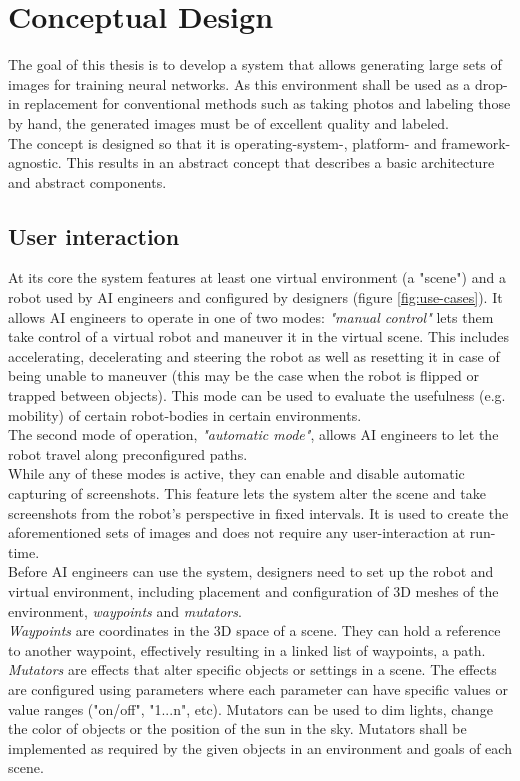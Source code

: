 \chapter{Conceptual Design}
\label{chap:conceptual-design}
The goal of this thesis is to develop a system that allows generating large sets of images for training neural networks. As this environment shall be used as a drop-in replacement for conventional methods such as taking photos and labeling those by hand, the generated images must be of excellent quality and labeled.\\
The concept is designed so that it is operating-system-, platform- and framework-agnostic. This results in an abstract concept that describes a basic architecture and abstract components. 

\section{User interaction}
At its core the system features at least one virtual environment (a "scene") and a robot used by AI engineers and configured by designers (figure \ref{fig:use-cases}). It allows AI engineers to operate in one of two modes: \textit{"manual control"} lets them take control of a virtual robot and maneuver it in the virtual scene. This includes accelerating, decelerating and steering the robot as well as resetting it in case of being unable to maneuver (this may be the case when the robot is flipped or trapped between objects). This mode can be used to evaluate the usefulness (e.g. mobility) of certain robot-bodies in certain environments.\\
The second mode of operation, \textit{"automatic mode"}, allows AI engineers to let the robot travel along preconfigured paths.\\
While any of these modes is active, they can enable and disable automatic capturing of screenshots. This feature lets the system alter the scene and take screenshots from the robot's perspective in fixed intervals. It is used to create the aforementioned sets of images and does not require any user-interaction at run-time.\\
Before AI engineers can use the system, designers need to set up the robot and virtual environment, including placement and configuration of 3D meshes of the environment, \textit{waypoints} and \textit{mutators}.\\
\textit{Waypoints} are coordinates in the 3D space of a scene. They can hold a reference to another waypoint, effectively resulting in a linked list of waypoints, a path.\\
\textit{Mutators} are effects that alter specific objects or settings in a scene. The effects are configured using parameters where each parameter can have specific values or value ranges ("on/off", "1...n", etc). Mutators can be used to dim lights, change the color of objects or the position of the sun in the sky. Mutators shall be implemented as required by the given objects in an environment and goals of each scene.

